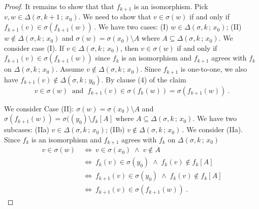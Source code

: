 \documentclass[10pt,a4paper]{amsart}
\begin{document}
\begin{proof}
It remains to show that that  $f_{ k+1}  $  is an isomorphism. 
Pick    $  v, w  \in  \Delta \left(  \sigma , k+1  \,  ;   \,   x_0   \right)   $. 
We need to show that  $  v  \in   \sigma ( w)   $  if and only if  $   f_{ k+1} ( v )   \in     \sigma  \left(   f_{ k+1} ( w )    \right)     \,    $.
We have two cases: 
(I) $   w  \in  \Delta \left(  \sigma , k  \,  ;   \,   x_0   \right)    $; 
(II)   $   w    \not\in  \Delta \left(  \sigma , k  \,  ;   \,   x_0   \right)    $  and 
$  \sigma ( w )  =   \sigma  ( x_0  )   \setminus  A    $
where    $   A    \subseteq    \Delta \left(  \sigma , k  \,  ;   \,   x_0   \right)   $.
We consider case (I). 
If  $  v  \in  \Delta \left(  \sigma , k \,  ;   \,   x_0   \right)   $,  
then   $  v  \in   \sigma ( w)   $  if and only if  $   f_{ k+1} ( v )   \in     \sigma  \left(   f_{ k+1} ( w )    \right)        $
since  $ f_k $  is an isomorphism and  $ f_{ k+1} $  agrees with $  f_k  $  on   $  \Delta \left(  \sigma , k \,  ;   \,   x_0   \right)   $. 
Assume   $  v    \not\in  \Delta \left(  \sigma , k \,  ;   \,   x_0   \right)   $. 
Since  $  f_{ k+1}  $  is one-to-one,   we also have  $  f_{ k+1}  \left(  v  \right)     \not\in  \Delta \left(  \sigma , k \,  ;   \,   y_0   \right)   $. 
By clause (4) of the claim
\[
v  \in   \sigma ( w)     \     \mbox{  and  }        \   
 f_{ k+1} ( v )   \in    \sigma  \left(   f_{ k} ( w )    \right)     =  \sigma  \left(   f_{ k+1} ( w )    \right)      
 \            .
\]








We consider Case (II):   $  \sigma ( w )  =   \sigma  ( x_0  )   \setminus  A    $
and  $  \sigma   \left(   f_{ k+1}    (w )    \right)   =   \sigma  (\left(   y_0    \right)   \setminus   f_k  \left[ A  \right]      $ 
where    $   A    \subseteq    \Delta \left(  \sigma , k  \,  ;   \,   x_0   \right)   $.
We have two subcases: 
(IIa)  $  v  \in    \Delta \left(  \sigma , k \,  ;   \,   x_0   \right)    $; 
(IIb)  $  v  \not\in   \Delta \left(  \sigma , k \,  ;   \,   x_0   \right)       \,    $. 
We consider (IIa). 
Since  $f_k $  is an isomorphism and  $  f_{ k+1}  $  agrees with  $  f_k  $  on   $   \Delta \left(  \sigma , k  \,  ;   \,   x_0   \right)   $
\begin{align*}
 v  \in   \sigma ( w)       \   
 &  \Leftrightarrow     \  
 v   \in  \sigma ( x_0 )     \;   \wedge    \;  v  \not\in  A  
 \\
  &  \Leftrightarrow     \  
 f_k  (v)    \in  \sigma  \left(   y_0  \right)     \;   \wedge    \;    f_k  (v)     \not\in  f_k  \left[  A  \right] 
   \\
  &  \Leftrightarrow     \  
 f_{k+1}  (v)    \in  \sigma  \left(   y_0  \right)     \;   \wedge    \;    f_k  (v)     \not\in  f_k  \left[  A  \right] 
       \\
  &  \Leftrightarrow     \  
   f_{k+1}  (v)     \in    \sigma   \left(    f_{k+1}  (w)    \right)  
   \        .
\end{align*}





\end{proof}
\end{document}
